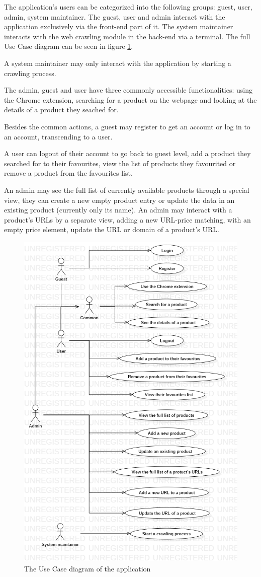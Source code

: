 \documentclass[12pt,a4paper,twoside]{report}
\begin{document}
The application's users can be categorized into the following groups: guest, user, admin, system maintainer. The guest, user and admin interact with the application exclusively via the front-end part of it. The system maintainer interacts with the web crawling module in the back-end via a terminal. The full Use Case diagram can be seen in figure \ref{fig:app_use_case}.

A system maintainer may only interact with the application by starting a crawling process.

The admin, guest and user have three commonly accessible functionalities: using the Chrome extension, searching for a product on the webpage and looking at the details of a product they seached for.

Besides the common actions, a guest may register to get an account or log in to an account, transcending to a user.

A user can logout of their account to go back to guest level, add a product they searched for to their favourites, view the list of products they favourited or remove a product from the favourites list.

An admin may see the full list of currently available products through a special view, they can create a new empty product entry or update the data in an existing product (currently only its name). An admin may interact with a product's URLs by a separate view, adding a new URL-price matching, with an empty price element, update the URL or domain of a product's URL.

\begin{figure}[ht]
  \centering
  \includegraphics[width=0.5\linewidth]{img/app_use_case.png}
  \caption[]{The Use Case diagram of the application}
  \label{fig:app_use_case}
\end{figure}
\end{document}
